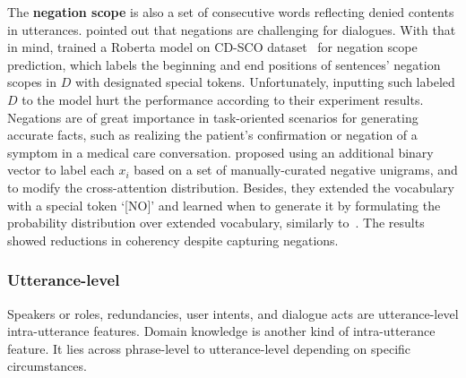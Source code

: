 The \textbf{negation scope} is also a set of consecutive words  
reflecting denied contents in utterances. \citet{chen2020multi} pointed out that negations are challenging for dialogues. With that in mind, \citet{khalifa2021bag} trained a Roberta model on CD-SCO dataset~\cite{morante2012sem} for negation scope prediction, which labels the beginning and end positions of sentences' negation scopes in $D$ with designated special tokens. Unfortunately, inputting such labeled $D$ to the model hurt the performance according to their experiment results. Negations are of great importance in task-oriented scenarios for generating accurate facts, such as realizing the patient's confirmation or negation of a symptom in a medical care conversation. \citet{joshi2020dr} proposed using an additional binary vector to label each $x_i$ based on a set of manually-curated negative unigrams, and to modify the cross-attention distribution. Besides, they extended the vocabulary with a special token `[NO]' and 
learned when to generate it by formulating the probability distribution over extended vocabulary, similarly to~\citet{see2017get}. The results showed reductions in coherency despite capturing negations.


\subsubsection{Utterance-level}
Speakers or roles, redundancies, user intents, and dialogue acts are utterance-level intra-utterance features. 
Domain knowledge is another kind of intra-utterance feature. It lies across phrase-level to utterance-level depending on specific circumstances. 

